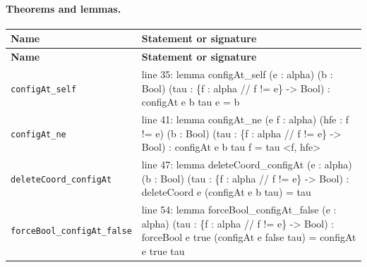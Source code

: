 \documentclass[10pt]{article}
\begin{document}
\paragraph{Theorems and lemmas.}
\begin{longtable}{>{\raggedright\arraybackslash}p{} >{\raggedright\arraybackslash}p{}}
\textbf{Name} & \textbf{Statement or signature} \\
\hline
\endfirsthead
\textbf{Name} & \textbf{Statement or signature} \\
\hline
\endhead
\texttt{configAt\_\allowbreak{}self} & {\ttfamily\scriptsize line 35:\allowbreak{} lemma configAt\_\allowbreak{}self (\allowbreak{}e :\allowbreak{} alpha)\allowbreak{} (\allowbreak{}b :\allowbreak{} Bool)\allowbreak{} (\allowbreak{}tau :\allowbreak{} \{f :\allowbreak{} alpha /\allowbreak{}/\allowbreak{} f !=\allowbreak{} e\} -\allowbreak{}> Bool)\allowbreak{} :\allowbreak{} configAt e b tau e =\allowbreak{} b} \\[0.45em]
\texttt{configAt\_\allowbreak{}ne} & {\ttfamily\scriptsize line 41:\allowbreak{} lemma configAt\_\allowbreak{}ne (\allowbreak{}e f :\allowbreak{} alpha)\allowbreak{} (\allowbreak{}hfe :\allowbreak{} f !=\allowbreak{} e)\allowbreak{} (\allowbreak{}b :\allowbreak{} Bool)\allowbreak{} (\allowbreak{}tau :\allowbreak{} \{f :\allowbreak{} alpha /\allowbreak{}/\allowbreak{} f !=\allowbreak{} e\} -\allowbreak{}> Bool)\allowbreak{} :\allowbreak{} configAt e b tau f =\allowbreak{} tau <f,\allowbreak{} hfe>} \\[0.45em]
\texttt{deleteCoord\_\allowbreak{}configAt} & {\ttfamily\scriptsize line 47:\allowbreak{} lemma deleteCoord\_\allowbreak{}configAt (\allowbreak{}e :\allowbreak{} alpha)\allowbreak{} (\allowbreak{}b :\allowbreak{} Bool)\allowbreak{} (\allowbreak{}tau :\allowbreak{} \{f :\allowbreak{} alpha /\allowbreak{}/\allowbreak{} f !=\allowbreak{} e\} -\allowbreak{}> Bool)\allowbreak{} :\allowbreak{} deleteCoord e (\allowbreak{}configAt e b tau)\allowbreak{} =\allowbreak{} tau} \\[0.45em]
\texttt{forceBool\_\allowbreak{}configAt\_\allowbreak{}false} & {\ttfamily\scriptsize line 54:\allowbreak{} lemma forceBool\_\allowbreak{}configAt\_\allowbreak{}false (\allowbreak{}e :\allowbreak{} alpha)\allowbreak{} (\allowbreak{}tau :\allowbreak{} \{f :\allowbreak{} alpha /\allowbreak{}/\allowbreak{} f !=\allowbreak{} e\} -\allowbreak{}> Bool)\allowbreak{} :\allowbreak{} forceBool e true (\allowbreak{}configAt e false tau)\allowbreak{} =\allowbreak{} configAt e true tau} \\[0.45em]

\end{longtable}
\end{document}
